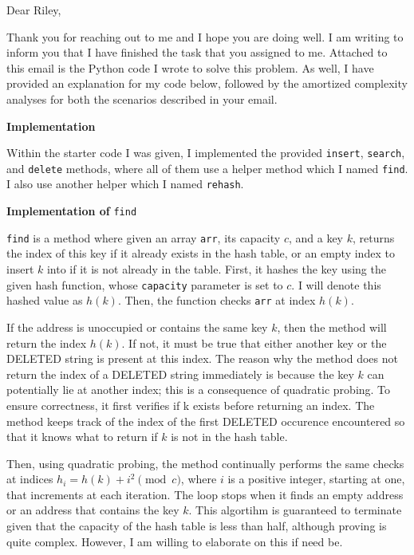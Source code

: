 \documentclass[11pt]{article}
\begin{document}
    Dear Riley,

    \medskip

    Thank you for reaching out to me and I hope you are doing well. I am writing to inform you that I have finished the task that you assigned to me. Attached to this email is the Python code I wrote to solve this problem. As well, I have provided an explanation for my code below, followed by the amortized complexity analyses for both the scenarios described in your email.

    \medskip

    \textbf{Implementation}

    Within the starter code I was given, I implemented the provided \texttt{insert}, \texttt{search}, and \texttt{delete} methods, where all of them use a helper method which I named \texttt{find}. I also use another helper which I named \texttt{rehash}.

    \medskip

    \textbf{Implementation of} \texttt{find}

    \texttt{find} is a method where given an array \texttt{arr}, its capacity \(c\), and a key \(k\), returns the index of this key if it already exists in the hash table, or an empty index to insert \(k\) into if it is not already in the table. First, it hashes the key using the given hash function, whose \texttt{capacity} parameter is set to \(c\). I will denote this hashed value as \(h(k)\). Then, the function checks \texttt{arr} at index \(h(k)\).
    
    If the address is unoccupied or contains the same key \(k\), then the method will return the index \(h(k)\). If not, it must be true that either another key or the DELETED string is present at this index. The reason why the method does not return the index of a DELETED string immediately is because the key \(k\) can potentially lie at another index; this is a consequence of quadratic probing. To ensure correctness, it first verifies if k exists before returning an index. The method keeps track of the index of the first DELETED occurence encountered so that it knows what to return if \(k\) is not in the hash table.
    
    Then, using quadratic probing, the method continually performs the same checks at indices \(h_i = h(k) + i^2 \pmod c\), where \(i\) is a positive integer, starting at one, that increments at each iteration. The loop stops when it finds an empty address or an address that contains the key \(k\). This algortihm is guaranteed to terminate given that the capacity of the hash table is less than half, although proving is quite complex. However, I am willing to elaborate on this if need be.
\end{document}
